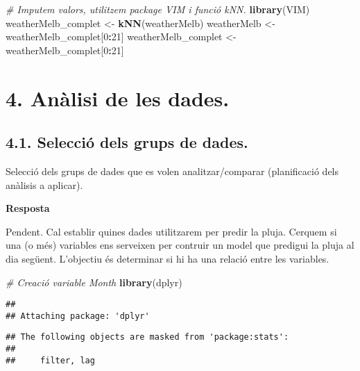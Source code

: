 \documentclass[
]{article}
\newenvironment{Shaded}{\begin{snugshade}}{\end{snugshade}}
\newcommand{\CommentTok}[1]{\textcolor[rgb]{0.56,0.35,0.01}{\textit{#1}}}
\newcommand{\DecValTok}[1]{\textcolor[rgb]{0.00,0.00,0.81}{#1}}
\newcommand{\KeywordTok}[1]{\textcolor[rgb]{0.13,0.29,0.53}{\textbf{#1}}}
\newcommand{\NormalTok}[1]{#1}
\newcommand{\OperatorTok}[1]{\textcolor[rgb]{0.81,0.36,0.00}{\textbf{#1}}}
\newcommand{\StringTok}[1]{\textcolor[rgb]{0.31,0.60,0.02}{#1}}
\begin{document}
\begin{Shaded}
\begin{Highlighting}[]
\CommentTok{# Imputem valors, utilitzem package VIM i funció kNN.}
\KeywordTok{library}\NormalTok{(VIM)}
\NormalTok{weatherMelb_complet <-}\StringTok{ }\KeywordTok{kNN}\NormalTok{(weatherMelb)}
\NormalTok{weatherMelb <-}\StringTok{ }\NormalTok{weatherMelb_complet[}\DecValTok{0}\OperatorTok{:}\DecValTok{21}\NormalTok{]}
\NormalTok{weatherMelb_complet <-}\StringTok{ }\NormalTok{weatherMelb_complet[}\DecValTok{0}\OperatorTok{:}\DecValTok{21}\NormalTok{]}
\end{Highlighting}
\end{Shaded}

\hypertarget{anuxe0lisi-de-les-dades.}{%
\section{4. Anàlisi de les dades.}\label{anuxe0lisi-de-les-dades.}}

\hypertarget{selecciuxf3-dels-grups-de-dades.}{%
\subsection{4.1. Selecció dels grups de
dades.}\label{selecciuxf3-dels-grups-de-dades.}}

Selecció dels grups de dades que es volen analitzar/comparar
(planificació dels anàlisis a aplicar).

\textbf{Resposta}

Pendent. Cal establir quines dades utilitzarem per predir la pluja.
Cerquem si una (o més) variables ens serveixen per contruir un model que
predigui la pluja al dia següent. L'objectiu és determinar si hi ha una
relació entre les variables.

\begin{Shaded}
\begin{Highlighting}[]
\CommentTok{# Creació variable Month}
\KeywordTok{library}\NormalTok{(dplyr)}
\end{Highlighting}
\end{Shaded}

\begin{verbatim}
## 
## Attaching package: 'dplyr'
\end{verbatim}

\begin{verbatim}
## The following objects are masked from 'package:stats':
## 
##     filter, lag
\end{verbatim}
\end{document}
